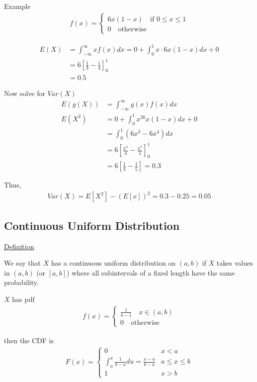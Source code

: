 \documentclass{article}
\begin{document}
Example
\begin{align*}
    f(x) = \begin{cases}
        6x(1-x) \quad \text{if } 0 \le x \le 1 \\
        0 \quad \text{otherwise}
    \end{cases}
\end{align*}

\begin{align*}
    E(X) &= \int_{-\infty}^{\infty}xf(x)dx = 0 + \int_0^1 x \cdot 6x(1-x)dx + 0 \\
    &= 6\left [\frac{1}{3}-\frac{1}{4}\right ]_0^1 \\
    &= 0.5
\end{align*}

Now solve for $Var(X)$
\begin{align*}
    E(g(X)) &= \int_{-\infty}^{\infty}g(x)f(x)dx \\
    E(X^2) &= 0 + \int_0^1 x^26x(1-x)dx + 0 \\
    &= \int_0^1(6x^3 - 6x^4)dx \\
    &= 6\left [\frac{x^4}{4} - \frac{x^5}{5}\right ]_0^1 \\
    &= 6 \left [\frac{1}{4} - \frac{1}{5}\right ] = 0.3
\end{align*}

Thus,
\begin{align*}
    Var(X) = E[X^2] - (E[x])^2 = 0.3 -0.25 = 0.05
\end{align*}

\subsection{Continuous Uniform Distribution}

\underline{Definition}

We say that $X$ has a continuous uniform distribution on $(a,b)$ if $X$ takes values in $(a,b)$ (or $[a,b]$) where all subintervals of a fixed length have the same probability.

$X$ has pdf
\begin{align*}
    f(x) = \begin{cases}
        \frac{1}{b-1} \quad x \in (a,b) \\
        0 \quad \text{otherwise}
    \end{cases}
\end{align*}

then the CDF is
\begin{align*}
    F(x) = \begin{cases}
        0 &x < a \\
        \int_a^x \frac{1}{b-a}du = \frac{x-a}{b-a} &a \le x \le b \\
        1 & x > b
    \end{cases}
\end{align*}
\end{document}
